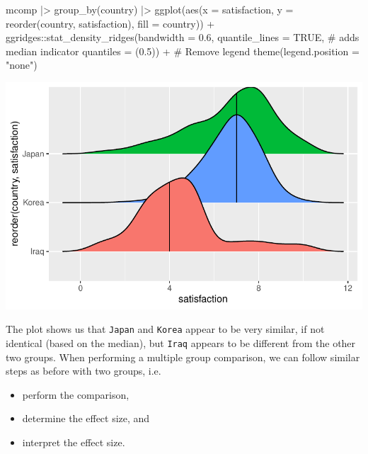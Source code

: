 \documentclass[
  letterpaper,
]{krantz}
\makeatletter
\newenvironment{Shaded}{\begin{snugshade}}{\end{snugshade}}
\newcommand{\AttributeTok}[1]{\textcolor[rgb]{0.40,0.45,0.13}{#1}}
\newcommand{\CommentTok}[1]{\textcolor[rgb]{0.37,0.37,0.37}{#1}}
\newcommand{\ConstantTok}[1]{\textcolor[rgb]{0.56,0.35,0.01}{#1}}
\newcommand{\FloatTok}[1]{\textcolor[rgb]{0.68,0.00,0.00}{#1}}
\newcommand{\FunctionTok}[1]{\textcolor[rgb]{0.28,0.35,0.67}{#1}}
\newcommand{\NormalTok}[1]{\textcolor[rgb]{0.00,0.23,0.31}{#1}}
\newcommand{\SpecialCharTok}[1]{\textcolor[rgb]{0.37,0.37,0.37}{#1}}
\newcommand{\StringTok}[1]{\textcolor[rgb]{0.13,0.47,0.30}{#1}}
\newenvironment{kframe}{%
\medskip{}
\setlength{\fboxsep}{.8em}
 \def\at@end@of@kframe{}%
 \ifinner\ifhmode%
  \def\at@end@of@kframe{\end{minipage}}%
  \begin{minipage}{\columnwidth}%
 \fi\fi%
 \def\FrameCommand##1{\hskip\@totalleftmargin \hskip-\fboxsep
 \colorbox{shadecolor}{##1}\hskip-\fboxsep
     \hskip-\linewidth \hskip-\@totalleftmargin \hskip\columnwidth}%
 \MakeFramed {\advance\hsize-\width
   \@totalleftmargin\z@ \linewidth\hsize
   \@setminipage}}%
 {\par\unskip\endMakeFramed%
 \at@end@of@kframe}
\renewenvironment{Shaded}{\begin{kframe}}{\end{kframe}}
\makeatother
\begin{document}
\begin{Shaded}
\begin{Highlighting}[]
\NormalTok{mcomp }\SpecialCharTok{|\textgreater{}}
  \FunctionTok{group\_by}\NormalTok{(country) }\SpecialCharTok{|\textgreater{}}
  \FunctionTok{ggplot}\NormalTok{(}\FunctionTok{aes}\NormalTok{(}\AttributeTok{x =}\NormalTok{ satisfaction,}
             \AttributeTok{y =} \FunctionTok{reorder}\NormalTok{(country, satisfaction),}
             \AttributeTok{fill =}\NormalTok{ country)) }\SpecialCharTok{+}
\NormalTok{  ggridges}\SpecialCharTok{::}\FunctionTok{stat\_density\_ridges}\NormalTok{(}\AttributeTok{bandwidth =} \FloatTok{0.6}\NormalTok{,}
                                \AttributeTok{quantile\_lines =} \ConstantTok{TRUE}\NormalTok{,   }\CommentTok{\# adds median indicator}
                                \AttributeTok{quantiles =}\NormalTok{ (}\FloatTok{0.5}\NormalTok{)) }\SpecialCharTok{+}
  \CommentTok{\# Remove legend}
  \FunctionTok{theme}\NormalTok{(}\AttributeTok{legend.position =} \StringTok{"none"}\NormalTok{)}
\end{Highlighting}
\end{Shaded}

\includegraphics{11_group_comparison_files/figure-pdf/multiple-unpaired-groups-plot-1.pdf}

The plot shows us that \texttt{Japan} and \texttt{Korea} appear to be
very similar, if not identical (based on the median), but \texttt{Iraq}
appears to be different from the other two groups. When performing a
multiple group comparison, we can follow similar steps as before with
two groups, i.e.

\begin{itemize}
\item
  perform the comparison,
\item
  determine the effect size, and
\item
  interpret the effect size.
\end{itemize}
\end{document}
